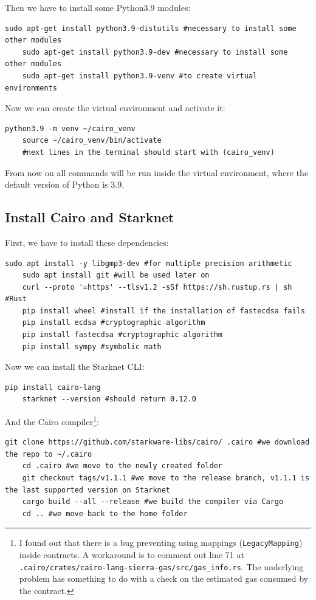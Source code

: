 \documentclass[12pt]{article}
\begin{document}
Then we have to install some Python3.9 modules:
\begin{lstlisting}[language=terminal]
    sudo apt-get install python3.9-distutils #necessary to install some other modules
    sudo apt-get install python3.9-dev #necessary to install some other modules
    sudo apt-get install python3.9-venv #to create virtual environments
\end{lstlisting}

Now we can create the virtual environment and activate it:
\begin{lstlisting}[language=terminal]
    python3.9 -m venv ~/cairo_venv
    source ~/cairo_venv/bin/activate
    #next lines in the terminal should start with (cairo_venv)
\end{lstlisting}

From now on all commands will be run inside the virtual environment, where the default version of Python is 3.9.

\subsection{Install Cairo and Starknet}
First, we have to install these dependencies:
\begin{lstlisting}[language=terminal]
    sudo apt install -y libgmp3-dev #for multiple precision arithmetic
    sudo apt install git #will be used later on
    curl --proto '=https' --tlsv1.2 -sSf https://sh.rustup.rs | sh #Rust
    pip install wheel #install if the installation of fastecdsa fails
    pip install ecdsa #cryptographic algorithm
    pip install fastecdsa #cryptographic algorithm
    pip install sympy #symbolic math
\end{lstlisting}

Now we can install the Starknet CLI:
\begin{lstlisting}[language=terminal]
    pip install cairo-lang
    starknet --version #should return 0.12.0
\end{lstlisting}

And the Cairo compiler\footnote{I found out that there is a bug preventing using mappings (\verb|LegacyMapping|) inside contracts. A workaround is to comment out line 71 at \verb|.cairo/crates/cairo-lang-sierra-gas/src/gas_info.rs|. The underlying problem has something to do with a check on the estimated gas consumed by the contract.}:
\begin{lstlisting}[language=terminal]
    git clone https://github.com/starkware-libs/cairo/ .cairo #we download the repo to ~/.cairo
    cd .cairo #we move to the newly created folder
    git checkout tags/v1.1.1 #we move to the release branch, v1.1.1 is the last supported version on Starknet
    cargo build --all --release #we build the compiler via Cargo
    cd .. #we move back to the home folder
\end{lstlisting}
\end{document}
